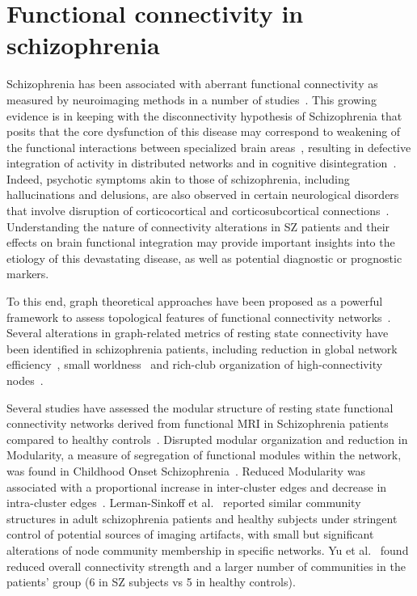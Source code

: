 \section{Functional connectivity in schizophrenia}
Schizophrenia has been associated with aberrant functional connectivity as measured by neuroimaging methods in a number of studies~\cite{friston1995,bullmore1998,liang2006,liu2008,calhoun2009,alexander-bloch2010,alexander-bloch2012,alexander-bloch2013}.
This growing evidence is in keeping with the disconnectivity hypothesis of Schizophrenia that posits that the core dysfunction of this disease may correspond to weakening of the functional interactions between specialized brain areas~\cite{ellison-wright2009,fornito2009,kubicki2005}, resulting in defective integration of activity in distributed networks and in cognitive disintegration~\cite{tononi2000}.
Indeed, psychotic symptoms akin to those of schizophrenia, including hallucinations and delusions, are also observed in certain neurological disorders that involve disruption of corticocortical and corticosubcortical connections~\cite{hyde1992}.
Understanding the nature of connectivity alterations in SZ patients and their effects on brain functional integration may provide important insights into the etiology of this devastating disease, as well as potential diagnostic or prognostic markers.

To this end, graph theoretical approaches have been proposed as a powerful framework to assess topological features of functional connectivity networks~\cite{bassett2006,bullmore2009,kaiser2011,stam2007}.
Several alterations in graph-related metrics of resting state connectivity have been identified in schizophrenia patients, including reduction in global network efficiency~\cite{liu2008,bullmore2009,bassett2008}, small worldness~\cite{liu2008,anderson2013,yu2011} and rich-club organization of high-connectivity nodes~\cite{vandenheuvel2013}.

Several studies have assessed the modular structure of resting state functional connectivity networks derived from functional MRI in Schizophrenia patients compared to healthy controls~\cite{liu2008,alexander-bloch2010,lerman-sinkoff2016}.
Disrupted modular organization and reduction in Modularity, a measure of segregation of functional modules within the network, was found in Childhood Onset Schizophrenia~\cite{alexander-bloch2010}.
Reduced Modularity was associated with a proportional increase in inter-cluster edges and decrease in intra-cluster edges~\cite{alexander-bloch2012}.
Lerman-Sinkoff et al.~\cite{lerman-sinkoff2016} reported similar community structures in adult schizophrenia patients and healthy subjects under stringent control of potential sources of imaging artifacts, with small but significant alterations of node community membership in specific networks.
Yu et al.~\cite{yu2012} found reduced overall connectivity strength and a larger number of communities in the patients' group (6 in SZ subjects vs 5 in healthy controls).

